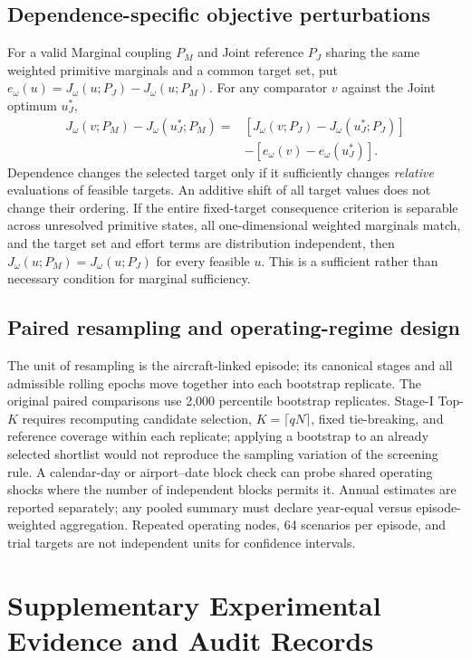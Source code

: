 \documentclass[10pt,a4paper]{article}
\numberwithin{equation}{section}
\begin{document}
\subsection{Dependence-specific objective perturbations}
For a valid Marginal coupling $P_M$ and Joint reference $P_J$ sharing the same weighted primitive marginals and a common target set, put $e_{\omega}(u)=J_{\omega}(u;P_J)-J_{\omega}(u;P_M)$. For any comparator $v$ against the Joint optimum $u_J^*$,
\begin{equation}
\begin{aligned}
J_{\omega}(v;P_M)-J_{\omega}(u_J^*;P_M)
={}&[J_{\omega}(v;P_J)-J_{\omega}(u_J^*;P_J)]\\
&-[e_{\omega}(v)-e_{\omega}(u_J^*)].
\end{aligned}
\label{eq:sup_dep_boundary}
\end{equation}
Dependence changes the selected target only if it sufficiently changes \emph{relative} evaluations of feasible targets. An additive shift of all target values does not change their ordering. If the entire fixed-target consequence criterion is separable across unresolved primitive states, all one-dimensional weighted marginals match, and the target set and effort terms are distribution independent, then $J_{\omega}(u;P_M)=J_{\omega}(u;P_J)$ for every feasible $u$. This is a sufficient rather than necessary condition for marginal sufficiency.

\subsection{Paired resampling and operating-regime design}
The unit of resampling is the aircraft-linked episode; its canonical stages and all admissible rolling epochs move together into each bootstrap replicate. The original paired comparisons use 2,000 percentile bootstrap replicates. Stage-I Top-$K$ requires recomputing candidate selection, $K=\lceil qN\rceil$, fixed tie-breaking, and reference coverage within each replicate; applying a bootstrap to an already selected shortlist would not reproduce the sampling variation of the screening rule. A calendar-day or airport--date block check can probe shared operating shocks where the number of independent blocks permits it. Annual estimates are reported separately; any pooled summary must declare year-equal versus episode-weighted aggregation. Repeated operating nodes, 64 scenarios per episode, and trial targets are not independent units for confidence intervals.


\section{Supplementary Experimental Evidence and Audit Records}
\label{sup:additional_results}
\end{document}
